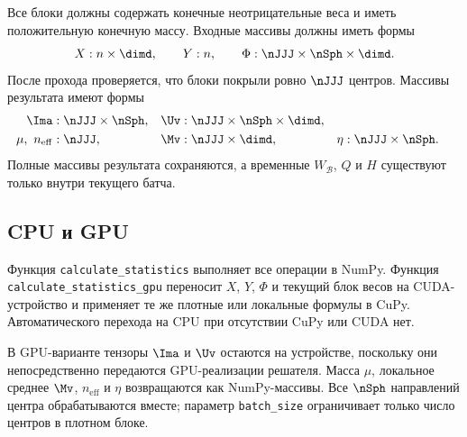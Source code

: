 Все блоки должны содержать конечные неотрицательные веса и иметь
положительную конечную массу. Входные массивы должны иметь формы
\begin{equation}
    X:n\times\dimd,
    \qquad
    Y:n,
    \qquad
    \Phi:\nJJJ\times\nSph\times\dimd.
\end{equation}
После прохода проверяется, что блоки покрыли ровно $\nJJJ$ центров.
Массивы результата имеют формы
\begin{align}
    \Ima&:\nJJJ\times\nSph,
    &
    \Uv&:\nJJJ\times\nSph\times\dimd,
    \\
    \mu,\ n_{\mathrm{eff}}&:\nJJJ,
    &
    \Mv&:\nJJJ\times\dimd,
    &
    \eta&:\nJJJ\times\nSph.
\end{align}
Полные массивы результата сохраняются, а временные $W_{\mathcal B}$,
$Q$ и $H$ существуют только внутри текущего батча.

\subsection{CPU и GPU}

Функция \texttt{calculate\_statistics} выполняет все операции в NumPy.
Функция \texttt{calculate\_statistics\_gpu} переносит $X$, $Y$,
$\Phi$ и текущий блок весов на CUDA-устройство и применяет те же
плотные или локальные формулы в CuPy. Автоматического перехода на CPU
при отсутствии CuPy или CUDA нет.

В GPU-варианте тензоры $\Ima$ и $\Uv$ остаются на устройстве, поскольку
они непосредственно передаются GPU-реализации решателя. Масса $\mu$,
локальное среднее $\Mv$, $n_{\mathrm{eff}}$ и $\eta$ возвращаются как
NumPy-массивы. Все $\nSph$ направлений центра обрабатываются вместе;
параметр \texttt{batch\_size} ограничивает только число центров в
плотном блоке.
